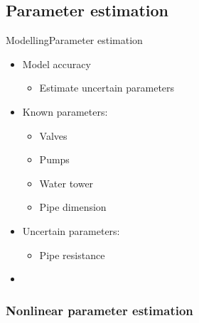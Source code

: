 

\subsection{Parameter estimation}

\begin{frame}{Modelling}{Parameter estimation}
\begin{itemize}
	\item<1-> Model accuracy
	\begin{itemize} 
		\item<1-> Estimate uncertain parameters 
	\end{itemize}	 
\end{itemize}

\begin{itemize}
	\item<2-> Known parameters:
	\begin{itemize}
		\item<2-> Valves
		\item<2-> Pumps 
		\item<2-> Water tower
		\item<2-> Pipe dimension
	\end{itemize}	
\end{itemize}

\begin{itemize}
\item<3-> Uncertain parameters:
	\begin{itemize}
		\item<3-> Pipe resistance
	\end{itemize}
\end{itemize}

\begin{itemize}
\item<4->[]	
\begin{figure}[H]
	\centering
	 
\end{figure}\vspace{-0.5cm}		
\end{itemize}	
\end{frame}



\subsubsection{Nonlinear parameter estimation}

